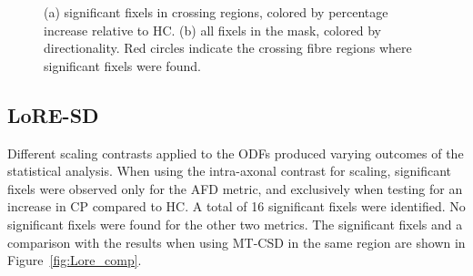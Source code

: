 \begin{figure}[H]
    \centering
    \hfill
    \caption{(a) significant fixels in crossing regions, colored by percentage increase relative to HC. (b) all fixels in the mask, colored by directionality. Red circles indicate the crossing fibre regions where significant fixels were found.}
    \label{fig:cross}
\end{figure}


\subsection{LoRE-SD}
Different scaling contrasts applied to the ODFs produced varying outcomes of the statistical analysis.
When using the intra-axonal contrast for scaling, significant fixels were observed only for the AFD metric, and exclusively when testing for an increase in CP compared to HC. A total of 16 significant fixels were identified. No significant fixels were found for the other two metrics. The significant fixels and a comparison with the results when using MT-CSD in the same region  are shown in Figure~\ref{fig:Lore_comp}. 


